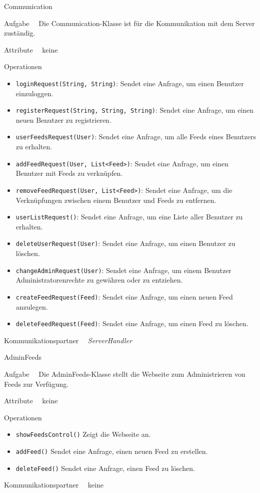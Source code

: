 \begin{class}{10}{Communication}
\item[Aufgabe]~\
Die Communication-Klasse ist für die Kommunikation mit dem Server zuständig.
\item[Attribute]~\ keine
\item[Operationen]~\
\begin{itemize}
  \item \texttt{loginRequest(String, String)}: Sendet eine Anfrage, um einen Benutzer einzuloggen.
  \item \texttt{registerRequest(String, String, String)}: Sendet eine Anfrage, um einen neuen Benutzer zu registrieren.
  \item \texttt{userFeedsRequest(User)}: Sendet eine Anfrage, um alle Feeds eines Benutzers zu erhalten.
  \item \texttt{addFeedRequest(User, List<Feed>)}: Sendet eine Anfrage, um einen Benutzer mit Feeds zu verknüpfen.
  \item \texttt{removeFeedRequest(User, List<Feed>)}: Sendet eine Anfrage, um die Verknüpfungen zwischen einem Benutzer und Feeds zu entfernen.
  \item \texttt{userListRequest()}: Sendet eine Anfrage, um eine Liste aller Benutzer zu erhalten.
  \item \texttt{deleteUserRequest(User)}: Sendet eine Anfrage, um einen Benutzer zu löschen.
  \item \texttt{changeAdminRequest(User)}: Sendet eine Anfrage, um einem Benutzer Administratorenrechte zu gewähren oder zu entziehen.
  \item \texttt{createFeedRequest(Feed)}: Sendet eine Anfrage, um einen neuen Feed anzulegen.
  \item \texttt{deleteFeedRequest(Feed)}: Sendet eine Anfrage, um einen Feed zu löschen.
\end{itemize}
\item[Kommunikationspartner]~\
  \textit{ServerHandler}
\end{class}

\begin{class}{20}{AdminFeeds}
\item[Aufgabe]~\
Die AdminFeeds-Klasse stellt die Webseite zum Administrieren von Feeds zur Verfügung.
\item[Attribute]~\ keine
\item[Operationen]~\
\begin{itemize}
    \item \texttt{showFeedsControl()} Zeigt die Webseite an.
    \item \texttt{addFeed()} Sendet eine Anfrage, einen neuen Feed zu erstellen.
    \item \texttt{deleteFeed()} Sendet eine Anfrage, einen Feed zu löschen.
\end{itemize}
\item[Kommunikationspartner]~\ keine
\end{class}

